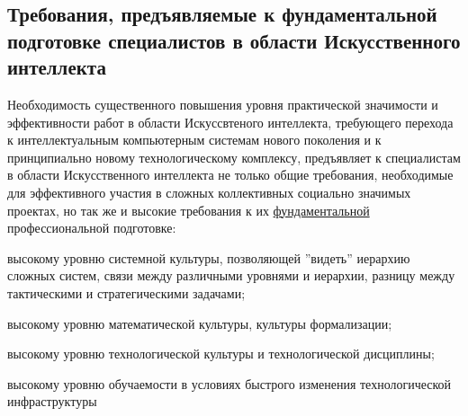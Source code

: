\subsection*{Требования, предъявляемые к фундаментальной подготовке специалистов в области Искусственного интеллекта}
Необходимость существенного повышения уровня практической значимости и эффективности работ в области Искуссвтеного интеллекта, требующего перехода к интеллектуальным компьютерным системам нового поколения и к принципиально новому технологическому комплексу, предъявляет к специалистам в области Искусственного интеллекта не только общие требования, необходимые для эффективного участия в сложных коллективных социально значимых проектах, но так же и высокие требования к их \uline{фундаментальной} профессиональной подготовке:
\begin{textitemize}
	\item высокому уровню системной культуры, позволяющей ''видеть'' иерархию сложных систем, связи между различными уровнями и иерархии, разницу между тактическими и стратегическими задачами;
	\item высокому уровню математической культуры, культуры формализации;
	\item высокому уровню технологической культуры и технологической дисциплины;
	\item высокому уровню обучаемости в условиях быстрого изменения технологической инфраструктуры
\end{textitemize}

